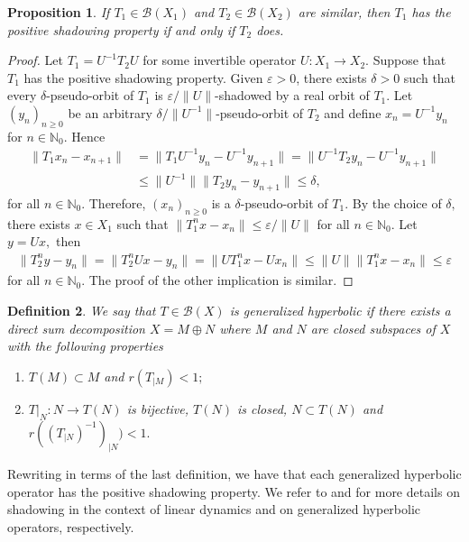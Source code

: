 \documentclass[11pt]{amsart}
\newtheorem{definition}{Definition}[section]
\theoremstyle{plain}
\newtheorem{proposition}[definition]{Proposition}
\theoremstyle{remark}
\theoremstyle{plain}
\begin{document}
\begin{proposition}\label{similar} If $T_1\in \mathcal{B}(X_1)$ and $T_2\in \mathcal{B}(X_2)$ are similar, then $T_1$ has the positive shadowing property if and only if $T_2$ does.
\end{proposition}
\begin{proof} Let $T_1=U^{-1}T_2U$ for some invertible operator $U:X_1\to X_2.$ Suppose that $T_1$ has the positive shadowing property. Given $\varepsilon>0$, there exists $\delta>0$ such that every $\delta$-pseudo-orbit  of $T_1$ is $\varepsilon/\|U\|$-shadowed by a real orbit of $T_1.$ Let $(y_n)_{n \geq 0}$ be an arbitrary $\delta/\|U^{-1}\|$-pseudo-orbit of $T_2$ and define $x_n=U^{-1}y_n$ for $n\in \mathbb{N}_0.$ Hence
\begin{align*}
\|T_1x_n-x_{n+1}\|&=\|T_1U^{-1}y_n-U^{-1}y_{n+1}\|=\|U^{-1}T_2y_n-U^{-1}y_{n+1}\|\\
&\leq \|U^{-1}\|\|T_2y_n-y_{n+1}\|\leq \delta,
\end{align*}
for all $n\in \mathbb{N}_0.$ Therefore, $(x_n)_{n \geq 0}$ is a $\delta$-pseudo-orbit  of $T_1.$ By the choice of $\delta,$ there exists $x \in X_1$ such that $\|T_1^nx-x_n\|\leq \varepsilon/\|U\|$ for all $n\in \mathbb{N}_0.$ Let $y=Ux,$ then
\begin{align*}
\|T_2^ny-y_n\|=\|T_2^nUx-y_n\|=\|UT_1^nx-Ux_n\|\leq \|U\|\|T_1^nx-x_n\|\leq \varepsilon
\end{align*}
for all $n\in \mathbb{N}_0.$ The proof of the other implication  is similar.
\end{proof}


\begin{definition} \normalfont We say that $T\in \mathcal{B}(X)$ is \textit{generalized hyperbolic} if there exists  a direct sum decomposition $X=M \oplus N $ where $M$ and $N$ are closed subspaces of $X$ with the following properties
\begin{enumerate}
    \item $T(M) \subset M$ and $r(T_{|M}) < 1;$
    \item $T|_{N}: N \to T(N)$ is bijective, $T(N)$ is closed, $N \subset T(N)$ and $r( (T{_{|N}})^{-1})_{|N}) < 1. $
\end{enumerate}
\end{definition}

Rewriting \cite[Proposition 19]{Bernardes_Messaoudi_shadowingprincipal} in terms of the last definition, we have that each generalized hyperbolic operator has the positive shadowing property. We refer to \cite{Bernardes_Messaoudi_shadowingprincipal, Bernardes_Alfred_Shadowing2024, Bernardes-Cirilo} and \cite{Favaro,Cirilo-Gollobit} for more details on shadowing in the context of linear dynamics and on generalized hyperbolic operators, respectively.
\end{document}

